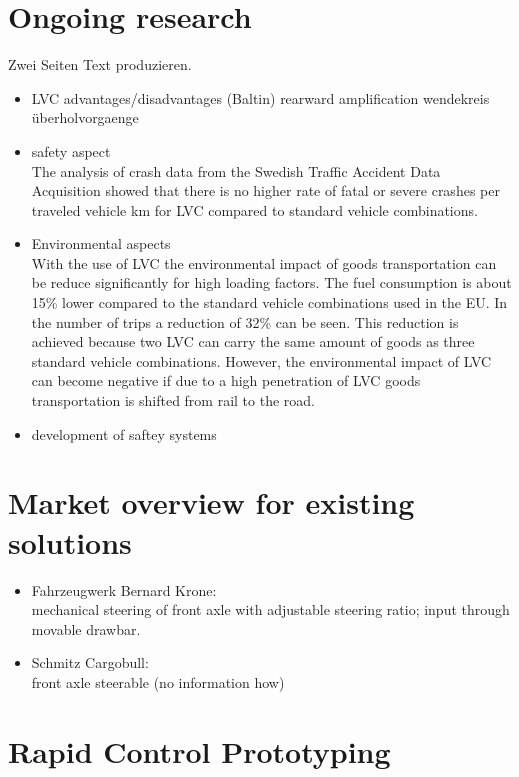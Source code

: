 \documentclass[ExampleMasters.tex]{subfiles}
\begin{document}
\section{Ongoing research}
\label{sec:ongoing_research}
Zwei Seiten Text produzieren. 
\begin{itemize}
	\item LVC advantages/disadvantages (Baltin)
	\subitem rearward amplification
	\subitem wendekreis
	\subitem überholvorgaenge
	\item safety aspect \\
	The analysis of crash data from the Swedish Traffic Accident Data Acquisition showed that there is no higher rate of fatal or severe crashes per traveled vehicle km for LVC compared to standard vehicle combinations. \cite{balint2013correlation}

	\item Environmental aspects \\
	With the use of LVC the environmental impact of goods transportation can be reduce significantly for high loading factors. The fuel consumption is about 15\% lower compared to the standard vehicle combinations used in the EU. In the number of trips a reduction of 32\% can be seen. This reduction is achieved because two LVC can carry the same amount of goods as three standard vehicle combinations.  \cite{backman2002improved}
	However, the environmental impact of LVC can become negative if due to a high penetration of LVC goods transportation is shifted from rail to the road. \cite{doll2009long}
	\item development of saftey systems
\end{itemize}

\section{Market overview for existing solutions}
\label{sec:market_overview}
\begin{itemize}
	\item Fahrzeugwerk Bernard Krone: \\
	mechanical steering of front axle with adjustable steering ratio; input through movable drawbar.
	\item Schmitz Cargobull: \\
	front axle steerable (no information how)
	
\end{itemize}
\section{Rapid Control Prototyping}
\label{sec:rapid_proto}
\end{document}
